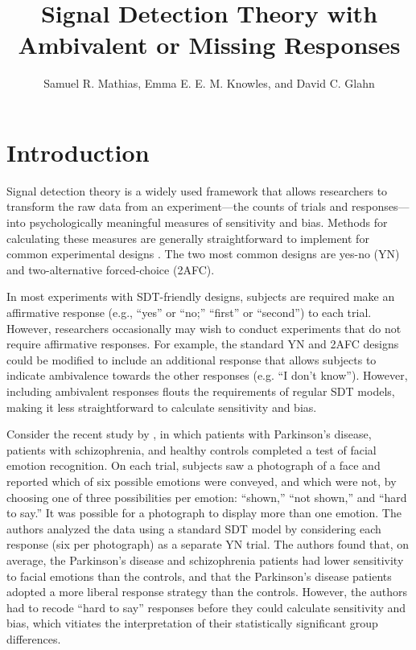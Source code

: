 \documentclass[man]{apa6}
\title{Signal Detection Theory with Ambivalent or Missing Responses}
\author{Samuel R. Mathias, Emma E. E. M. Knowles, and David C. Glahn}
\affiliation{Yale University}
\begin{document}
\maketitle

\section{Introduction}
Signal detection theory is a widely used framework that allows researchers to transform the raw data from an experiment---the counts of trials and responses---into psychologically meaningful measures of sensitivity and bias. Methods for calculating these measures are generally straightforward to implement for common experimental designs \parencite[see][]{Green1966, Macmillan2005}. The two most common designs are yes-no (YN) and two-alternative forced-choice (2AFC).

In most experiments with SDT-friendly designs, subjects are required make an affirmative response (e.g., ``yes'' or ``no;'' ``first'' or ``second'') to each trial. However, researchers occasionally may wish to conduct experiments that do not require affirmative responses. For example, the standard YN and 2AFC designs could be modified to include an additional response that allows subjects to indicate ambivalence towards the other responses (e.g. ``I don't know''). However, including ambivalent responses flouts the requirements of regular SDT models, making it less straightforward to calculate sensitivity and bias.

Consider the recent study by \textcite{laskowskaemotional2015}, in which patients with Parkinson's disease, patients with schizophrenia, and healthy controls completed a test of facial emotion recognition. On each trial, subjects saw a photograph of a face and reported which of six possible emotions were conveyed, and which were not, by choosing one of three possibilities per emotion: ``shown,'' ``not shown,'' and ``hard to say.'' It was possible for a photograph to display more than one emotion. The authors analyzed the data using a standard SDT model by considering each response (six per photograph) as a separate YN trial. The authors found that, on average, the Parkinson's disease and schizophrenia patients had lower sensitivity to facial emotions than the controls, and that the Parkinson's disease patients adopted a more liberal response strategy than the controls. However, the authors had to recode ``hard to say'' responses before they could calculate sensitivity and bias, which vitiates the interpretation of their statistically significant group differences.
\end{document}
